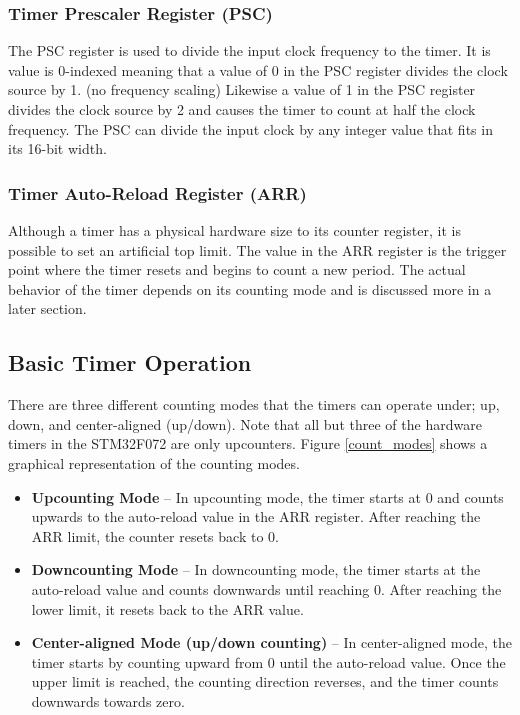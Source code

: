 \documentclass[11pt,fleqn]{book} %
\begin{document}
    \subsubsection{Timer Prescaler Register (PSC)}
    The PSC register is used to divide the input clock frequency to the timer. It is value is 0-indexed meaning that a value of 0 in the PSC register divides the clock source by 1. (no frequency scaling) Likewise a value of 1 in the PSC register divides the clock source by 2 and causes the timer to count at half the clock frequency. The PSC can divide the input clock by any integer value that fits in its 16-bit width.  
    \subsubsection{Timer Auto-Reload Register (ARR)}
     Although a timer has a physical hardware size to its counter register, it is possible to set an artificial top limit. The value in the ARR register is the trigger point where the timer resets and begins to count a new period. The actual behavior of the timer depends on its counting mode and is discussed more in a later section. 

    
    \subsection{Basic Timer Operation}
    
    There are three different counting modes that the timers can operate under; up, down, and center-aligned (up/down). Note that all but three of the hardware timers in the STM32F072 are only upcounters. Figure \ref{count_modes} shows a graphical representation of the counting modes.  
    
    \begin{itemize}
        \item \textbf{Upcounting Mode} --  In upcounting mode, the timer starts at 0 and counts upwards to the auto-reload value in the ARR register. After reaching the ARR limit, the counter resets back to 0. 
        \item \textbf{Downcounting Mode} -- In downcounting mode, the timer starts at the auto-reload value and counts downwards until reaching 0. After reaching the lower limit, it resets back to the ARR value.
        \item \textbf{Center-aligned Mode (up/down counting)} -- In center-aligned mode, the timer starts by counting upward from 0 until the auto-reload value. Once the upper limit is reached, the counting direction reverses, and the timer counts downwards towards zero.
    \end{itemize}
\end{document}
